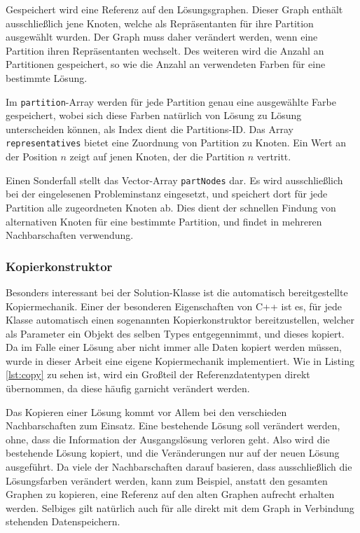 Gespeichert wird eine Referenz auf den Lösungsgraphen. Dieser Graph enthält ausschließlich jene Knoten, welche als Repräsentanten für ihre Partition
ausgewählt wurden. Der Graph muss daher verändert werden, wenn eine Partition ihren Repräsentanten wechselt. Des weiteren wird die Anzahl an Partitionen
gespeichert, so wie die Anzahl an verwendeten Farben für eine bestimmte Lösung. 

Im \texttt{partition}-Array werden für jede Partition genau eine ausgewählte Farbe gespeichert, wobei sich diese Farben natürlich von Lösung zu Lösung 
unterscheiden können, als Index dient die Partitions-ID. Das Array \texttt{representatives} bietet eine Zuordnung von Partition zu Knoten. Ein Wert 
an der Position $n$ zeigt auf jenen Knoten, der die Partition $n$ vertritt.

Einen Sonderfall stellt das Vector-Array \texttt{partNodes} dar. Es wird ausschließlich bei der eingelesenen Probleminstanz eingesetzt, und speichert
dort für jede Partition alle zugeordneten Knoten ab. Dies dient der schnellen Findung von alternativen Knoten für eine bestimmte Partition, und findet
in mehreren Nachbarschaften verwendung. 

\subsubsection{Kopierkonstruktor}

Besonders interessant bei der Solution-Klasse ist die automatisch bereitgestellte Kopiermechanik. Einer der besonderen Eigenschaften von C++ ist es, für jede Klasse automatisch einen sogenannten Kopierkonstruktor
bereitzustellen, welcher als Parameter ein Objekt des selben Types entgegennimmt, und dieses kopiert. Da im Falle einer Lösung aber nicht immer alle Daten kopiert werden müssen, wurde in dieser Arbeit eine
eigene Kopiermechanik implementiert. Wie in Listing \ref{lst:copy} zu sehen ist, wird ein Großteil der Referenzdatentypen direkt übernommen, da diese häufig garnicht verändert werden. 

Das Kopieren einer Lösung kommt vor Allem bei den verschieden Nachbarschaften zum Einsatz. Eine bestehende Lösung soll verändert werden, ohne, dass die Information der Ausgangslösung verloren geht. Also wird
die bestehende Lösung kopiert, und die Veränderungen nur auf der neuen Lösung ausgeführt. Da viele der Nachbarschaften darauf basieren, dass ausschließlich die Lösungsfarben verändert werden, kann zum Beispiel, 
anstatt den gesamten Graphen zu kopieren, eine Referenz auf den alten Graphen aufrecht erhalten werden. Selbiges gilt natürlich auch für alle direkt mit dem Graph in Verbindung stehenden Datenspeichern. 

